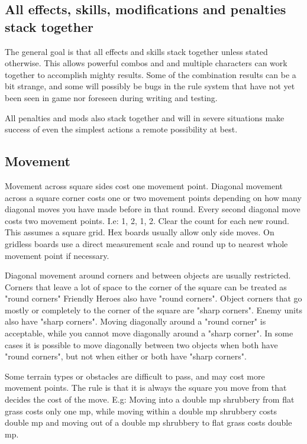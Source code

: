 \subsection*{All effects, skills, modifications and penalties stack together}
The general goal is that all effects and skills stack together unless stated otherwise. This allows powerful combos and and multiple characters can work together to accomplish mighty results. Some of the combination results can be a bit strange, and some will possibly be bugs in the rule system that have not yet been seen in game nor foreseen during writing and testing.

All penalties and mods also stack together and will in severe situations make success of even the simplest actions a remote possibility at best.


\subsection*{Movement}
Movement across square sides cost one movement point. Diagonal movement across a square corner costs one or two movement points depending on how many diagonal moves you have made before in that round. Every second diagonal move costs two movement points. I.e: 1, 2, 1, 2. Clear the count for each new round.
This assumes a square grid. Hex boards usually allow only side moves. On gridless boards use a direct measurement scale and round up to nearest whole movement point if necessary.

Diagonal movement around corners and between objects are usually restricted.
Corners that leave a lot of space to the corner of the square can be treated as "round corners" Friendly Heroes also have "round corners".
Object corners that go mostly or completely to the corner of the square are "sharp corners". Enemy units also have "sharp corners".
Moving diagonally around a "round corner" is acceptable, while you cannot move diagonally around a "sharp corner". In some cases it is possible to move diagonally between two objects when both have "round corners", but not when either or both have "sharp corners".

Some terrain types or obstacles are difficult to pass, and may cost more movement points. The rule is that it is always the square you move from that decides the cost of the move. E.g: Moving into a double mp shrubbery from flat grass costs only one mp, while moving within a double mp shrubbery costs double mp and moving out of a double mp shrubbery to flat grass costs double mp.

